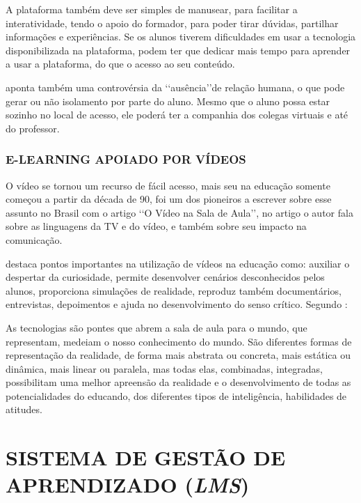 A plataforma também deve ser simples de manusear, para facilitar a interatividade, tendo o apoio do formador, para poder tirar dúvidas, partilhar informações e experiências. Se os alunos tiverem dificuldades em usar a tecnologia disponibilizada na plataforma, podem ter que dedicar mais tempo para aprender a usar a plataforma, do que o acesso ao seu conteúdo. 

 aponta também uma controvérsia da \lq\lq ausência\rq\rq de relação humana, o que pode gerar ou não isolamento por parte do aluno. Mesmo que o aluno possa estar sozinho no local de acesso, ele poderá ter a companhia dos colegas virtuais e até do professor.

\subsubsection{E-LEARNING APOIADO POR VÍDEOS}
O vídeo se tornou um recurso de fácil acesso, mais seu na educação somente começou a partir da década de 90,  foi um dos pioneiros a escrever sobre esse assunto no Brasil com o artigo \lq\lq O Vídeo na Sala de Aula\rq\rq, no artigo o autor fala sobre as linguagens da TV e do vídeo, e também sobre seu impacto na comunicação.

 destaca pontos importantes na utilização de vídeos na educação como: auxiliar o despertar da curiosidade, permite desenvolver cenários desconhecidos pelos alunos, proporciona simulações de realidade, reproduz também documentários, entrevistas, depoimentos e ajuda no desenvolvimento do senso crítico. Segundo :
\begin{citacao}
  As tecnologias são pontes que abrem a sala de aula para o mundo, que representam, medeiam o nosso conhecimento do mundo. São diferentes formas de representação da realidade, de forma mais abstrata ou concreta, mais estática ou dinâmica, mais linear ou paralela, mas todas elas, combinadas, integradas, possibilitam uma melhor apreensão da realidade e o desenvolvimento de todas as potencialidades do educando, dos diferentes tipos de inteligência, habilidades de atitudes.
\end{citacao}

\section{SISTEMA DE GESTÃO DE APRENDIZADO (\textit{LMS})}
\label{sec:lms}

